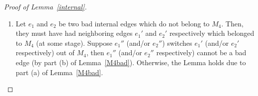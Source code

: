 \documentclass[11pt]{article}
\begin{document}
\begin{appendix}
\begin{proof}[Proof of Lemma~\ref{internal}]
\begin{enumerate}
\begin{itemize}
 \end{itemize}
\item Let $e_1$ and $e_2$ be two bad internal edges which do not belong to $M_4$. Then, they must have had neighboring edges $e_1'$ and $e_2'$ respectively which belonged to $M_4$ (at some stage). Suppose $e_1''$ (and/or $e_2''$) switches $e_1'$ (and/or $e_2'$ respectively) out of $M_4$, then $e_1''$ (and/or $e_2''$ respectively) cannot be a bad edge (by part (b) of Lemma~\ref{M4bad}). Otherwise, the Lemma holds due to part (a) of Lemma~\ref{M4bad}.
\end{enumerate}

 
\end{proof}

\end{appendix}
\end{document}

